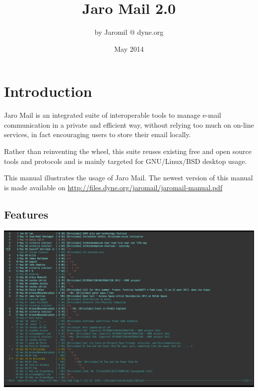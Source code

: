 \documentclass[a4,onecolumn,portrait]{article}
\author{by Jaromil @ dyne.org}
\date{May 2014}
\title{Jaro Mail 2.0}
\begin{document}
\maketitle
\tableofcontents

\fancyhf{}
\fancyfoot[C]{-- \thepage\ --}

\renewcommand{\headrulewidth}{0.4pt}
\renewcommand{\footrulewidth}{0.4pt}

\pagebreak


\section{Introduction}
\label{sec-1}

Jaro Mail is an integrated suite of interoperable tools to manage
e-mail communication in a private and efficient way, without relying
too much on on-line services, in fact encouraging users to store their
email locally.

Rather than reinventing the wheel, this suite reuses existing free and
open source tools and protocols and is mainly targeted for
GNU/Linux/BSD desktop usage.

This manual illustrates the usage of Jaro Mail. The newest version of
this manual is made available on \url{http://files.dyne.org/jaromail/jaromail-manual.pdf}

\subsection{Features}
\label{sec-1-1}

\includegraphics[width=.9\linewidth]{jaromail-shot.jpg}
\end{document}
